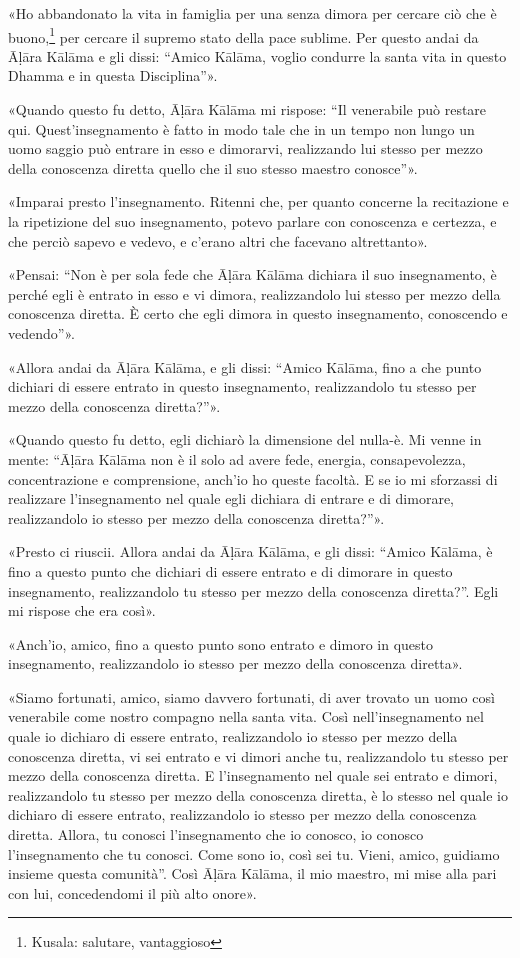 
 «Ho abbandonato la vita in famiglia per una senza dimora per
cercare ciò che è buono,\footnote{Kusala: salutare, vantaggioso} per cercare il
supremo stato della pace sublime. Per questo andai da Āḷāra Kālāma e gli dissi:
“Amico Kālāma, voglio condurre la santa vita in questo Dhamma e in questa
Disciplina”».

«Quando questo fu detto, Āḷāra Kālāma mi rispose: “Il venerabile può restare
qui. Quest’insegnamento è fatto in modo tale che in un tempo non lungo un uomo
saggio può entrare in esso e dimorarvi, realizzando lui stesso per mezzo della
conoscenza diretta quello che il suo stesso maestro conosce”».

«Imparai presto l’insegnamento. Ritenni che, per quanto concerne la recitazione
e la ripetizione del suo insegnamento, potevo parlare con conoscenza e certezza,
e che perciò sapevo e vedevo, e c’erano altri che facevano altrettanto».

«Pensai: “Non è per sola fede che Āḷāra Kālāma dichiara il suo insegnamento, è
perché egli è entrato in esso e vi dimora, realizzandolo lui stesso per mezzo
della conoscenza diretta. È certo che egli dimora in questo insegnamento,
conoscendo e vedendo”».

«Allora andai da Āḷāra Kālāma, e gli dissi: “Amico Kālāma, fino a che punto
dichiari di essere entrato in questo insegnamento, realizzandolo tu stesso per
mezzo della conoscenza diretta?”».

«Quando questo fu detto, egli dichiarò la dimensione del nulla-è. Mi venne in
mente: “Āḷāra Kālāma non è il solo ad avere fede, energia, consapevolezza,
concentrazione e comprensione, anch’io ho queste facoltà. E se io mi sforzassi
di realizzare l’insegnamento nel quale egli dichiara di entrare e di dimorare,
realizzandolo io stesso per mezzo della conoscenza diretta?”».

«Presto ci riuscii. Allora andai da Āḷāra Kālāma, e gli dissi: “Amico Kālāma, è
fino a questo punto che dichiari di essere entrato e di dimorare in questo
insegnamento, realizzandolo tu stesso per mezzo della conoscenza diretta?”. Egli
mi rispose che era così».

«Anch’io, amico, fino a questo punto sono entrato e dimoro in questo
insegnamento, realizzandolo io stesso per mezzo della conoscenza diretta».

«Siamo fortunati, amico, siamo davvero fortunati, di aver trovato un uomo così
venerabile come nostro compagno nella santa vita. Così nell’insegnamento nel
quale io dichiaro di essere entrato, realizzandolo io stesso per mezzo della
conoscenza diretta, vi sei entrato e vi dimori anche tu, realizzandolo tu stesso
per mezzo della conoscenza diretta. E l’insegnamento nel quale sei entrato e
dimori, realizzandolo tu stesso per mezzo della conoscenza diretta, è lo stesso
nel quale io dichiaro di essere entrato, realizzandolo io stesso per mezzo della
conoscenza diretta. Allora, tu conosci l’insegnamento che io conosco, io conosco
l’insegnamento che tu conosci. Come sono io, così sei tu. Vieni, amico, guidiamo
insieme questa comunità”. Così Āḷāra Kālāma, il mio maestro, mi mise alla pari
con lui, concedendomi il più alto onore».

